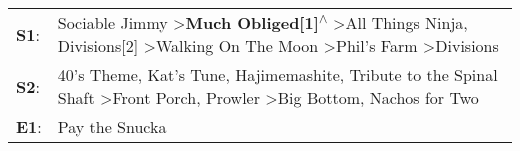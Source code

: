 \begin{supertabular}{p{0.03\textwidth}p{0.92\textwidth}}
 \textbf{S1}:  &  Sociable Jimmy\textsuperscript{} \textgreater \enspace \textbf{Much Obliged[1]\textsuperscript{$\wedge$}} \textgreater \enspace All Things Ninja\textsuperscript{}, \enspace Divisions[2]\textsuperscript{} \textgreater \enspace Walking On The Moon\textsuperscript{} \textgreater \enspace Phil's Farm\textsuperscript{} \textgreater \enspace Divisions\textsuperscript{}  \enspace  \\
 \textbf{S2}:  &                    40's Theme\textsuperscript{}, \enspace Kat's Tune\textsuperscript{}, \enspace Hajimemashite\textsuperscript{}, \enspace Tribute to the Spinal Shaft\textsuperscript{} \textgreater \enspace Front Porch\textsuperscript{}, \enspace Prowler\textsuperscript{} \textgreater \enspace Big Bottom\textsuperscript{}, \enspace Nachos for Two\textsuperscript{}  \enspace  \\
 \textbf{E1}:  &                                                                                                                                                                                                                                                                                                                                               Pay the Snucka\textsuperscript{}  \enspace  \\
\end{supertabular}
